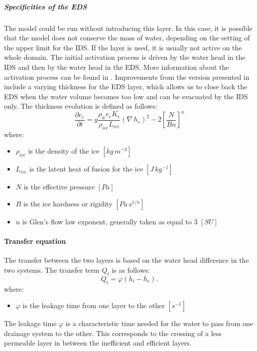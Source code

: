 \subparagraph{Specificities of the EDS}
The model could be run without introducing this layer. In this case, it is possible that the model does not conserve the mass of water, depending on the setting of the upper limit for the IDS. If the layer is used, it is usually not active on the whole domain. The initial activation process is driven by the water head in the IDS and then by the water head in the EDS. More information about the activation process can be found in \cite{Fleurian2014}. Improvements from the version presented in \cite{Fleurian2014} include a varying thickness for the EDS layer, which allows us to close back the EDS when the water volume becomes too low and can be evacuated by the IDS only. The thickness evolution is defined as follows:
\begin{equation}
	\frac{\partial e_e}{\partial t}= g \frac{\rho_w e_e K_e}{\rho_{ice} L_{ice}} \left(\nabla\,h_e\right)^2 - 2\left[\frac{N}{Bn}\right]^{n}
\end{equation}
where:
\begin{itemize}
	\item $\rho_{ice}$ is the density of the ice $[kg\,m^{-3}]$
	\item $L_{ice}$ is the latent heat of fusion for the ice $[J\,kg^{-1}]$
	\item $N$ is the effective pressure $[Pa]$
	\item $B$ is the ice hardness or rigidity $[Pa\,s^{1/n}]$
	\item $n$ is Glen's flow law exponent, generally taken as equal to 3 $[SU]$
\end{itemize}

\paragraph{Transfer equation}
The transfer between the two layers is based on the water head difference in the two systems. The transfer term $Q_t$ is as follows:
\begin{equation}
 Q_{\mathrm{t}} = \varphi(h_i-h_e).
\end{equation}
where:
\begin{itemize}
	\item $\varphi$ is the leakage time from one layer to the other $[s^{-1}]$
\end{itemize}

The leakage time $\varphi$ is a characteristic time needed for the water to pass from one drainage system to the other. This corresponds to the crossing of a less permeable layer in between the inefficient and efficient layers.


